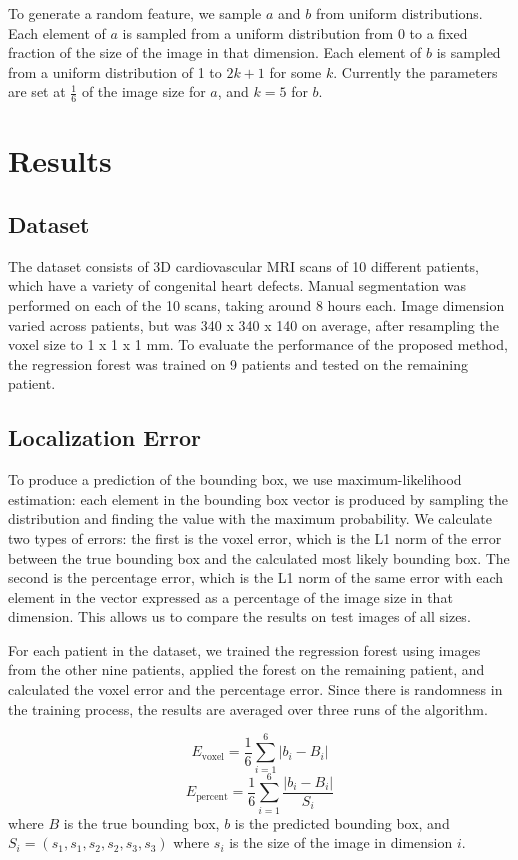 To generate a random feature, we sample $a$ and $b$ from uniform distributions. Each element of $a$ is sampled from a uniform distribution from 0 to a fixed fraction of the size of the image in that dimension. Each element of $b$ is sampled from a uniform distribution of 1 to $2k+1$ for some $k$. Currently the parameters are set at $\frac{1}{6}$ of the image size for $a$, and $k = 5$ for $b$. 

\section{Results}
\subsection{Dataset}
The dataset consists of 3D cardiovascular MRI scans of 10 different patients, which have a variety of congenital heart defects. Manual segmentation was performed on each of the 10 scans, taking around 8 hours each. Image dimension varied across patients, but was 340 x 340 x 140 on average, after resampling the voxel size to 1 x 1 x 1 mm. To evaluate the performance of the proposed method, the regression forest was trained on 9 patients and tested on the remaining patient. 

\subsection{Localization Error}
To produce a prediction of the bounding box, we use maximum-likelihood estimation: each element in the bounding box vector is produced by sampling the distribution and finding the value with the maximum probability. We calculate two types of errors: the first is the voxel error, which is the L1 norm of the error between the true bounding box and the calculated most likely bounding box. The second is the percentage error, which is the L1 norm of the same error with each element in the vector expressed as a percentage of the image size in that dimension. This allows us to compare the results on test images of all sizes.

For each patient in the dataset, we trained the regression forest using images from the other nine patients, applied the forest on the remaining patient, and calculated the voxel error and the percentage error. Since there is randomness in the training process, the results are averaged over three runs of the algorithm.

\begin{equation}
  E_{\text{voxel}} = \frac{1}{6} \sum_{i=1} ^ {6} |b_i - B_i|
\end{equation}
\begin{equation}
  E_{\text{percent}} = \frac{1}{6} \sum_{i=1} ^ {6} \frac{|b_i - B_i|}{S_{i}}
\end{equation}
where $B$ is the true bounding box, $b$ is the predicted bounding box, and $S_i = (s_1, s_1, s_2, s_2, s_3, s_3)$ where $s_i$ is the size of the image in dimension $i$.


